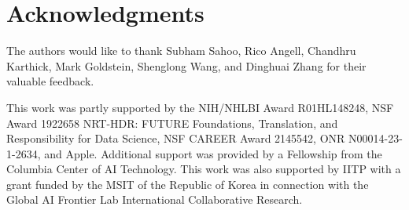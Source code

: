 \section{Acknowledgments}
The authors would like to thank Subham Sahoo, Rico Angell, Chandhru Karthick, Mark Goldstein, Shenglong Wang, and Dinghuai Zhang for their valuable feedback. 

This work was partly supported by the NIH/NHLBI Award R01HL148248, NSF Award 1922658 NRT-HDR:
FUTURE Foundations, Translation, and Responsibility for Data Science, NSF CAREER Award 2145542,
ONR N00014-23-1-2634, and Apple. Additional support was provided by a Fellowship from the Columbia
Center of AI Technology. This work was also supported by IITP with a grant funded by the MSIT of the Republic of Korea in connection with the Global AI Frontier Lab International Collaborative Research.










